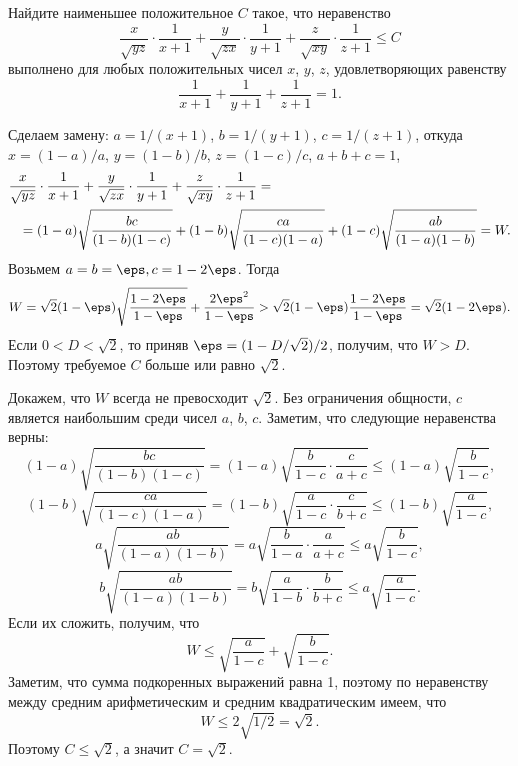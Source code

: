 Найдите наименьшее положительное $C$ такое, что неравенство
\[
    \frac{x}{\sqrt{yz}} \cdot \frac{1}{x+1}
    +
    \frac{y}{\sqrt{zx}} \cdot \frac{1}{y+1}
    +
    \frac{z}{\sqrt{xy}} \cdot \frac{1}{z+1}
\leq
    C
\]
выполнено для любых положительных чисел $x$, $y$, $z$, удовлетворяющих
равенству
\[
    \frac{1}{x+1} + \frac{1}{y+1} + \frac{1}{z+1}
=
    1
.\]

\solution
Сделаем замену:
$a = 1 / (x + 1)$, $b = 1 / (y + 1)$,  $c = 1 / (z + 1)$, откуда
$x = (1 - a) / a$, $y = (1 - b) / b$, $z = (1 - c) / c$,
$a + b + c = 1$,
\begin{align*}
    \frac{x}{\sqrt{y z}} & \cdot \frac{1}{x + 1}
    +
    \frac{y}{\sqrt{z x}} \cdot \frac{1}{y + 1}
    +
    \frac{z}{\sqrt{x y}} \cdot \frac{1}{z + 1}
=\\={}&
    (1 - a) \sqrt{\frac{b c \mathstrut}{(1 - b) (1 - c)}}
    +
    (1 - b) \sqrt{\frac{c a \mathstrut}{(1 - c) (1 - a)}}
    +
    (1 - c) \sqrt{\frac{a b \mathstrut}{(1 - a) (1 - b)}}
=
    W
.\end{align*}
Возьмем $a = b = \eps, c = 1 - 2 \eps$.
Тогда 
\[
    W
=
    \sqrt{2} (1 - \eps) \sqrt{\frac{1 - 2 \eps}{1 - \eps}}
    +
    \frac{2{\eps}^2}{1 - \eps}
>
    \sqrt{2} (1 - \eps) \frac{1 - 2 \eps}{1 - \eps}
=
    \sqrt{2} (1 - 2 \eps).
\]
Если $0 < D < \sqrt{2}$, то приняв $\eps = (1 - D / \sqrt{2}) / 2$,
получим, что $W > D$.
Поэтому требуемое $C$ больше или равно $\sqrt{2}$.
\par
Докажем, что $W$ всегда не превосходит $\sqrt{2}$.
Без ограничения общности, $c$ является наибольшим среди чисел $a$, $b$, $c$.
Заметим, что следующие неравенства верны:
\[
    (1 - a) \sqrt{\frac{b c}{(1 - b) (1 - c)}}
=
    (1 - a) \sqrt{\frac{b}{1 - c} \cdot \frac{c}{a + c}}
\leq
    (1 - a) \sqrt{\frac{b}{1 - c}}
,\]
\[
    (1 - b) \sqrt{\frac{c a}{(1 - c) (1 - a)}}
=
    (1 - b) \sqrt{\frac{a}{1 - c} \cdot \frac{c}{b + c}}
\leq
    (1 - b) \sqrt{\frac{a}{1 - c}}
,\]
\[
    a \sqrt{\frac{a b}{(1 - a) (1 - b)}}
=
    a \sqrt{\frac{b}{1 - a} \cdot \frac{a}{a + c}}
\leq
    a \sqrt{\frac{b}{1 - c}}
,\]
\[
    b \sqrt{\frac{a b}{(1 - a) (1 - b)}}
=
    b \sqrt{\frac{a}{1 - b} \cdot \frac{b}{b + c}}
\leq
    a \sqrt{\frac{a}{1 - c}}
.\]
Если их сложить, получим, что 
\[
    W
\leq
    \sqrt{\frac{a}{1 - c}} + \sqrt{\frac{b}{1 - c}}
.\]
Заметим, что сумма подкоренных выражений равна 1, поэтому по неравенству
между средним арифметическим и средним квадратическим имеем, что
\[
    W
\leq
    2 \sqrt{1 / 2}
=
    \sqrt{2}
.\]
Поэтому $C \leq \sqrt{2}$, а значит $C = \sqrt{2}$.  

